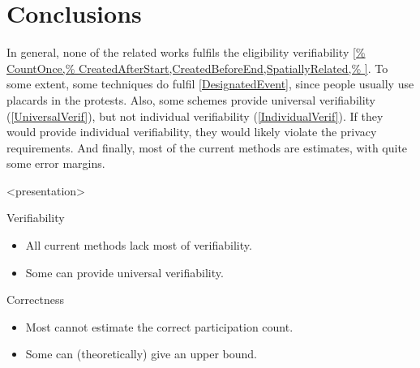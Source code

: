 \mode*
\section{Conclusions}


In general, none of the related works fulfils the eligibility verifiability 
\cref{%
  CountOnce,%
  CreatedAfterStart,CreatedBeforeEnd,SpatiallyRelated,%
}.
To some extent, some techniques do fulfil \cref{DesignatedEvent}, since people 
usually use placards in the protests.
Also, some schemes provide universal verifiability (\cref{UniversalVerif}), but 
not individual verifiability (\cref{IndividualVerif}).
If they would provide individual verifiability, they would likely violate the 
privacy requirements.
And finally, most of the current methods are estimates, with quite some error 
margins.

\begin{frame}<presentation>
  \begin{block}{Verifiability}
    \begin{itemize}
      \item All current methods lack most of verifiability.
      \item Some can provide universal verifiability.
    \end{itemize}
  \end{block}

  \pause{}

  \begin{block}{Correctness}
    \begin{itemize}
      \item Most cannot estimate the correct participation count.
      \item Some can (theoretically) give an upper bound.
    \end{itemize}
  \end{block}
\end{frame}
